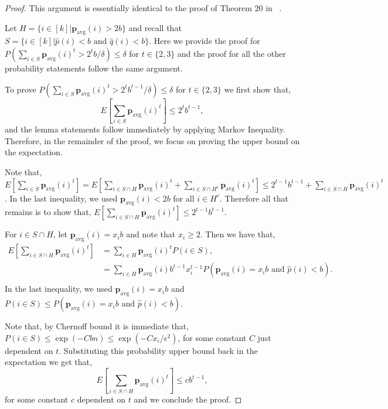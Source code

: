 \documentclass[10pt]{article} %
\theoremstyle{plain}
\newcommand{\bp}{\textbf{p}}
\newcommand{\avg}{\mathrm{avg}}
\begin{document}
\begin{proof} This argument is essentially identical to the proof of Theorem 20 in ~\cite{chan2014optimal}.

Let $H=\{i \in [k]|\bp_{\avg}(i)>2b \}$ and recall that $S=\{i \in [k]|\hat{p}(i)<b \text{ and } \hat{q}(i)<b\}$. Here we provide the proof for $P(\sum_{i \in S}\bp_{\avg}(i)^t>2^{t}b/\delta) \leq \delta$ for $t \in \{2,3\}$ and the proof for all the other probability statements follow the same argument.

To prove $P(\sum_{i \in S}\bp_{\avg}(i)^t>2^{t}b^{t-1}/\delta) \leq \delta$ for $t \in \{2,3\}$ we first show that,
$$E[\sum_{i \in S}\bp_{\avg}(i)^t] \leq 2^t b^{t-1},$$
and the lemma statements follow immediately by applying Markov Inequality. Therefore, in the remainder of the proof, we focus on proving the upper bound on the expectation.

Note that, $E[\sum_{i \in S}\bp_{\avg}(i)^t] = E[\sum_{i \in S \cap H}\bp_{\avg}(i)^t + \sum_{i \in S \cap H^{c}}\bp_{\avg}(i)^t] \leq 2^{t-1} b^{t-1} + \sum_{i \in S \cap H}\bp_{\avg}(i)^t$. In the last inequality, we used  $\bp_{\avg}(i)<2b$ for all $i \in H^{c}$.  Therefore all that remains is to show that, $E[\sum_{i \in S \cap H}\bp_{\avg}(i)^t] \leq 2^{t-1}b^{t-1}$.

For $i \in S \cap H$, let $\bp_{\avg}(i) = x_i b$ and note that $x_i\geq 2$. Then we have that,
\begin{align*}
    E[\sum_{i \in S \cap H}\bp_{\avg}(i)^t] & = \sum_{i \in  H}\bp_{\avg}(i)^t P(i \in S),\\
    & = \sum_{i \in  H}\bp_{\avg}(i) b^{t-1} x_i^{t-1}  P(\bp_{\avg}(i)=x_i b \text{ and }\hat{p}(i)<b).\\
\end{align*}
In the last inequality, we used $\bp_{\avg}(i) =x_i b$ and $P(i \in S) \leq P(\bp_{\avg}(i)=x_ib \text{ and }\hat{p}(i)<b)$.

Note that, by Chernoff bound it is immediate that, $P(i \in S) \leq \exp(-Cbn) \leq \exp(-Cx_i/\epsilon^2) $, for some constant $C$ just dependent on $t$. Substituting this probability upper bound back in the expectation we get that,
$$E[\sum_{i \in S \cap H}\bp_{\avg}(i)^t] \leq cb^{t-1}, $$
for some constant $c$ dependent on $t$ and we conclude the proof. 

	
	
	
	
	
\end{proof}
\end{document}

